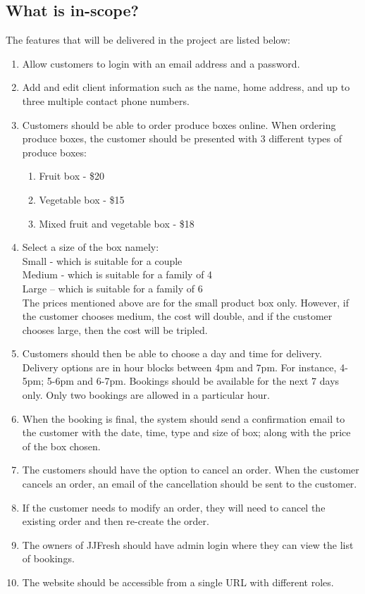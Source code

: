 \documentclass{report}
\begin{document}
\subsection{What is in-scope?}
The features that will be delivered in the project are listed below:
\begin{enumerate}
  \item Allow customers to login with an email address and a password.
  \item Add and edit client information such as the name, home address, and up to three multiple contact phone numbers.
  \item Customers should be able to order produce boxes online. When ordering produce boxes, the customer should be presented with 3 different types of produce boxes:
  \begin{enumerate}[label=\alph*.]
    \item Fruit box - \$20
    \item Vegetable box - \$15
    \item Mixed fruit and vegetable box - \$18
  \end{enumerate}
  \item Select a size of the box namely:\\
        Small - which is suitable for a couple\\
        Medium - which is suitable for a family of 4\\
        Large – which is suitable for a family of 6\\
        The prices mentioned above are for the small product box only. However, if the customer chooses medium, the cost will double, and if the customer chooses large, then the cost will be tripled.
  \item Customers should then be able to choose a day and time for delivery. Delivery options are in hour blocks between 4pm and 7pm. For instance, 4-5pm; 5-6pm and 6-7pm. Bookings should be available for the next 7 days only. Only two bookings are allowed in a particular hour.
  \item When the booking is final, the system should send a confirmation email to the customer with the date, time, type and size of box; along with the price of the box chosen.
  \item The customers should have the option to cancel an order. When the customer cancels an order, an email of the cancellation should be sent to the customer.
  \item If the customer needs to modify an order, they will need to cancel the existing order and then re-create the order.
  \item The owners of JJFresh should have admin login where they can view the list of bookings.
  \item The website should be accessible from a single URL with different roles.

\end{enumerate}
\end{document}
